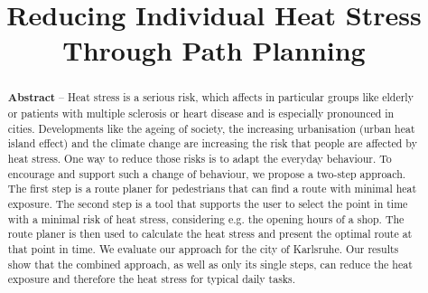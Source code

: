 \documentclass[a4paper,parskip=half]{scrartcl}
\title{Reducing Individual Heat Stress Through Path Planning}
\author{}
\begin{document}
\maketitle

\begin{abstract}
\noindent \textbf{Abstract} -- Heat stress is a serious risk, which affects in particular  groups like elderly or patients with multiple sclerosis or heart disease and is especially pronounced in cities. Developments like the ageing of society, the increasing urbanisation (urban heat island effect) and the climate change are increasing the risk that people are affected by heat stress. One way to reduce those risks is to adapt the everyday behaviour. 
To encourage and support such a change of behaviour, we propose a two-step approach. The first step is a route planer for pedestrians that can find a route with minimal heat exposure. The second step is a tool that supports the user to select the point in time with a minimal risk of heat stress, considering e.g. the opening hours of a shop. The route planer is then used to calculate the heat stress and present the optimal route at that point in time.
We evaluate our approach for the city of Karlsruhe. 	
Our results show that the combined approach, as well as only its single steps, can reduce the heat exposure and therefore the heat stress for typical daily tasks.
\end{abstract}







%


\printbibliography
\end{document}
